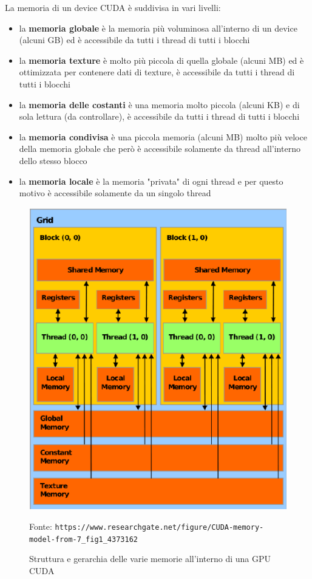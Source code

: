 \documentclass[12pt,a4paper]{book}
\newcommand{\source}[1]{\caption*{Fonte: {\small\texttt{#1}}} }
\begin{document}
	La memoria di un device CUDA è suddivisa in vari livelli:
	\begin{itemize}
		\item la \textbf{memoria globale} è la memoria più voluminosa all'interno di un device (alcuni GB) ed è accessibile da tutti i thread di tutti i blocchi
		\item la \textbf{memoria texture} è molto più piccola di quella globale (alcuni MB) ed è ottimizzata per contenere dati di texture, è accessibile da tutti i thread di tutti i blocchi
		\item la \textbf{memoria delle costanti} è una memoria molto piccola (alcuni KB) e di sola lettura (da controllare), è accessibile da tutti i thread di tutti i blocchi
		\item la \textbf{memoria condivisa} è una piccola memoria (alcuni MB) molto più veloce della memoria globale che però è accessibile solamente da thread all'interno dello stesso blocco
		\item la \textbf{memoria locale} è la memoria "privata" di ogni thread e per questo motivo è accessibile solamente da un singolo thread
	\end{itemize}
	
	\begin{figure}[!ht]
		\centering
		\includegraphics[width=0.5\linewidth]{CUDA-memory-model}
		\caption[Struttura della memoria di una GPU CUDA]{Struttura e gerarchia delle varie memorie all'interno di una GPU CUDA}
		\source{https://www.researchgate.net/figure/CUDA-memory-model-from-7\_fig1\_4373162}
		\label{fig:cuda-memory-model}
	\end{figure}
	
\end{document}
